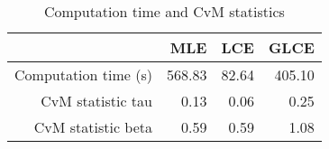\begin{table}[ht]
\centering
\begin{tabular}{rrrr}
  \hline
 & MLE & LCE & GLCE \\ 
  \hline
Computation time (s) & 568.83 & 82.64 & 405.10 \\ 
  CvM statistic tau & 0.13 & 0.06 & 0.25 \\ 
  CvM statistic beta & 0.59 & 0.59 & 1.08 \\ 
   \hline
\end{tabular}
\caption{Computation time and CvM statistics} 
\label{tab:weibull:generic:time:cvm}
\end{table}

